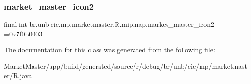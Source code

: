 \subsubsection{\texorpdfstring{market\+\_\+master\+\_\+icon2}{market\_master\_icon2}}
{\footnotesize\ttfamily final int br.\+unb.\+cic.\+mp.\+marketmaster.\+R.\+mipmap.\+market\+\_\+master\+\_\+icon2 =0x7f0b0003\hspace{0.3cm}{\ttfamily [static]}}



The documentation for this class was generated from the following file\+:\begin{DoxyCompactItemize}
\item 
Market\+Master/app/build/generated/source/r/debug/br/unb/cic/mp/marketmaster/\mbox{\hyperlink{debug_2br_2unb_2cic_2mp_2marketmaster_2R_8java}{R.\+java}}\end{DoxyCompactItemize}
